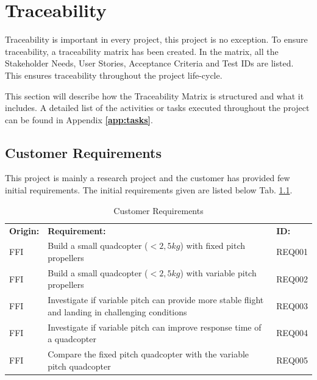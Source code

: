 \chapter{Traceability}
Traceability is important in every project, this project is no exception. To ensure traceability, a traceability matrix has been created. In the matrix, all the Stakeholder Needs, User Stories, Acceptance Criteria and Test IDs are listed. This ensures traceability throughout the project life-cycle.  \bigskip

This section will describe how the Traceability Matrix is structured and what it includes. A detailed list of the activities or tasks executed throughout the project can be found in Appendix \textbf{\ref{app:tasks}}.

\section{Customer Requirements}
This project is mainly a research project and the customer has provided few initial requirements. The initial requirements given are listed below Tab. \ref{tab:custreq}.\bigskip


\begin{table}[h]
    \centering
    \begin{tabular}{|m{2cm} p{11cm} p{2cm}|}
    \hline
\rowcolor{cadetgrey}\textbf{Origin: } & \textbf{Requirement: } & \textbf{ID: } \\
                        FFI & Build a small quadcopter ($<2,5 kg$) with fixed pitch propellers & REQ001 \\ 
\rowcolor{gainsboro}    FFI & Build a small quadcopter ($<2,5 kg$) with variable pitch propellers & REQ002\\
                        FFI & Investigate if variable pitch can provide more stable flight and landing in challenging conditions & REQ003  \\ 
\rowcolor{gainsboro}    FFI & Investigate if variable pitch can improve response time of a quadcopter & REQ004\\
                        FFI & Compare the fixed pitch quadcopter with the variable pitch quadcopter & REQ005  \\
\hline

    \end{tabular}
    \caption{Customer Requirements}
    \label{tab:custreq}
\end{table}

